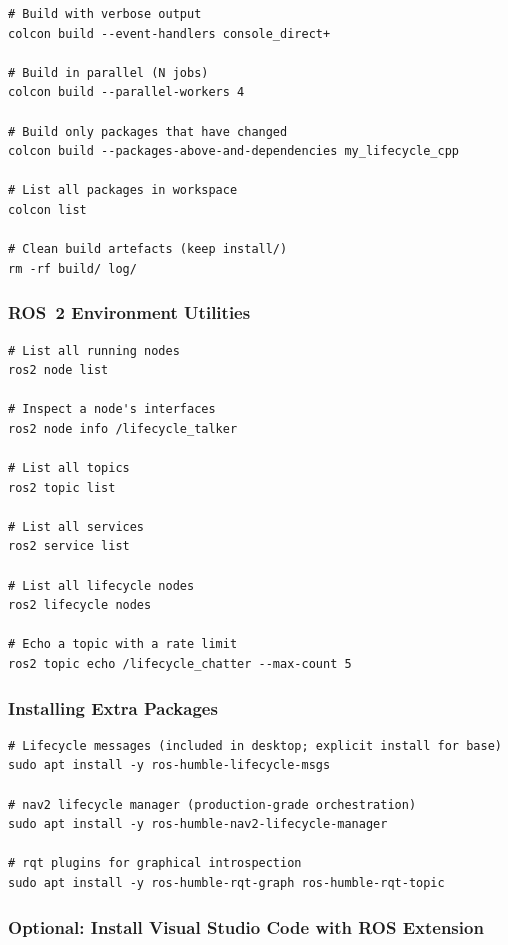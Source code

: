 \documentclass[11pt,a4paper]{csarticle}
\begin{document}
\begin{lstlisting}[style=bash]
# Build with verbose output
colcon build --event-handlers console_direct+

# Build in parallel (N jobs)
colcon build --parallel-workers 4

# Build only packages that have changed
colcon build --packages-above-and-dependencies my_lifecycle_cpp

# List all packages in workspace
colcon list

# Clean build artefacts (keep install/)
rm -rf build/ log/
\end{lstlisting}

\subsubsection{ROS~2 Environment Utilities}

\begin{lstlisting}[style=bash]
# List all running nodes
ros2 node list

# Inspect a node's interfaces
ros2 node info /lifecycle_talker

# List all topics
ros2 topic list

# List all services
ros2 service list

# List all lifecycle nodes
ros2 lifecycle nodes

# Echo a topic with a rate limit
ros2 topic echo /lifecycle_chatter --max-count 5
\end{lstlisting}

\subsubsection{Installing Extra Packages}

\begin{lstlisting}[style=bash]
# Lifecycle messages (included in desktop; explicit install for base)
sudo apt install -y ros-humble-lifecycle-msgs

# nav2 lifecycle manager (production-grade orchestration)
sudo apt install -y ros-humble-nav2-lifecycle-manager

# rqt plugins for graphical introspection
sudo apt install -y ros-humble-rqt-graph ros-humble-rqt-topic
\end{lstlisting}

\subsubsection{Optional: Install Visual Studio Code with ROS Extension}
\end{document}
